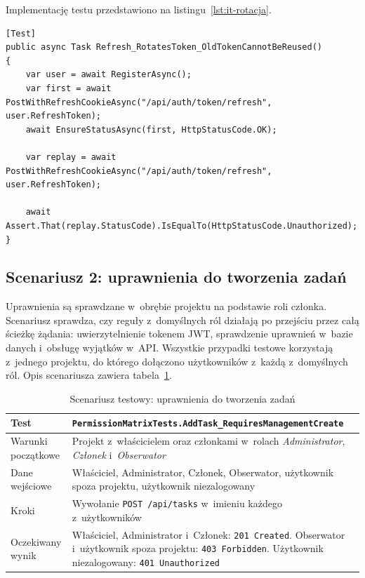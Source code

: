 Implementację testu przedstawiono na listingu~\ref{lst:it-rotacja}.

\begin{lstlisting}[basicstyle=\footnotesize\ttfamily, captionpos=t, caption={Test rotacji tokena odświeżania}, label={lst:it-rotacja}]
[Test]
public async Task Refresh_RotatesToken_OldTokenCannotBeReused()
{
    var user = await RegisterAsync();
    var first = await PostWithRefreshCookieAsync("/api/auth/token/refresh", user.RefreshToken);
    await EnsureStatusAsync(first, HttpStatusCode.OK);

    var replay = await PostWithRefreshCookieAsync("/api/auth/token/refresh", user.RefreshToken);

    await Assert.That(replay.StatusCode).IsEqualTo(HttpStatusCode.Unauthorized);
}
\end{lstlisting}

\subsection{Scenariusz 2: uprawnienia do tworzenia zadań}
Uprawnienia są sprawdzane w~obrębie projektu na podstawie roli członka. Scenariusz sprawdza, czy reguły z~domyślnych ról
działają po przejściu przez całą ścieżkę żądania: uwierzytelnienie tokenem JWT, sprawdzenie uprawnień w~bazie danych
i~obsługę wyjątków w~API. Wszystkie przypadki testowe korzystają z~jednego projektu, do którego dołączono użytkowników
z~każdą z~domyślnych ról. Opis scenariusza zawiera tabela~\ref{tab:it-uprawnienia}.

\begin{table}[htb]
    \centering
    \caption{Scenariusz testowy: uprawnienia do tworzenia zadań}
    \label{tab:it-uprawnienia}
    \small
    \begin{tabularx}{\linewidth}{@{}>{\raggedright\arraybackslash}p{3.5cm} >{\raggedright\arraybackslash}X@{}}
        \hline
        Test & \texttt{PermissionMatrixTests.\allowbreak{}AddTask\_\allowbreak{}RequiresManagementCreate} \\ \hline
        Warunki początkowe & Projekt z~właścicielem oraz członkami w~rolach \textit{Administrator}, \textit{Członek} i~\textit{Obserwator} \\ \hline
        Dane wejściowe & Właściciel, Administrator, Członek, Obserwator, użytkownik spoza projektu, użytkownik niezalogowany \\ \hline
        Kroki & Wywołanie \texttt{POST /api/tasks} w~imieniu każdego z~użytkowników \\ \hline
        Oczekiwany wynik & Właściciel, Administrator i~Członek: \texttt{201 Created}. Obserwator i~użytkownik spoza projektu: \texttt{403 Forbidden}. Użytkownik niezalogowany: \texttt{401 Unauthorized} \\ \hline
    \end{tabularx}
\end{table}

